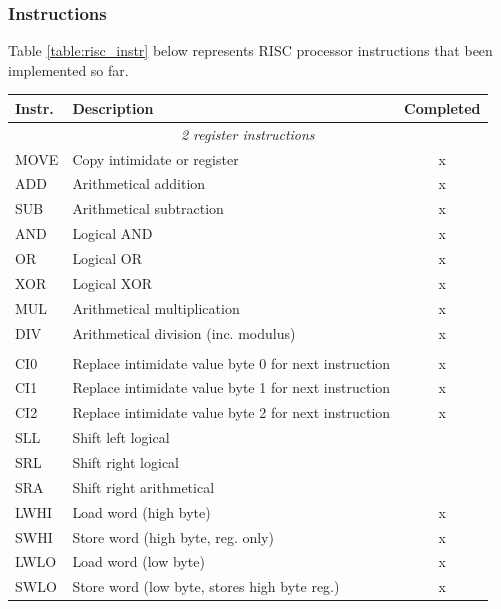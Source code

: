\documentclass[a4paper,12pt]{article}
\begin{document}
\subsubsection{Instructions}
Table \ref{table:risc_instr} below represents RISC processor instructions that been implemented so far.
\begin{longtable}{| l | p{} | c |}
	\hline 
	\rowcolor[rgb]{0.82,0.82,0.82}
	Instr. & Description & Completed \\\hline
		

	\multicolumn{3}{|c|}{
		\cellcolor[rgb]{0.7,0.7,1}\textit{2 register instructions}} \\\hline
	\arrayrulecolor[rgb]{0.82,0.82,0.82}
		
	MOVE & Copy intimidate or register & x \\\hline
	ADD  & Arithmetical addition & x \\
	SUB  & Arithmetical subtraction & x \\
	AND  & Logical AND & x \\
	OR   & Logical OR & x \\
	XOR  & Logical XOR & x \\
	MUL  & Arithmetical multiplication & x \\
	DIV  & Arithmetical division (inc. modulus) & x \\
		

	\arrayrulecolor{black}\hline
	\multicolumn{3}{|c|}{
		\cellcolor[rgb]{0.7,0.7,1}\textit{1 register instructions}} \\
	\hline\arrayrulecolor[rgb]{0.82,0.82,0.82}
	
	CI0  & Replace intimidate value byte 0 for next instruction & x \\
	CI1  & Replace intimidate value byte 1 for next instruction & x \\
	CI2  & Replace intimidate value byte 2 for next instruction & x \\\hline
		
	SLL  & Shift left logical & \\
	SRL  & Shift right logical & \\
	SRA  & Shift right arithmetical & \\\hline
		
	LWHI & Load word (high byte) & x \\
	SWHI & Store word (high byte, reg. only) & x \\
	LWLO & Load word (low byte) & x \\
	SWLO & Store word (low byte, stores high byte reg.) & x \\\hline
		

\end{longtable}
\end{document}
